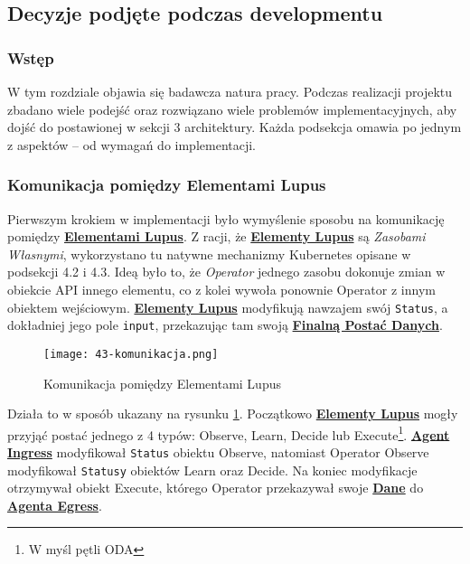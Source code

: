 \subsection{Decyzje podjęte podczas developmentu}

\subsubsection{Wstęp}

W tym rozdziale objawia się badawcza natura pracy. Podczas realizacji projektu zbadano wiele podejść oraz rozwiązano wiele problemów implementacyjnych, aby dojść do postawionej w sekcji 3 architektury. Każda podsekcja omawia po jednym z aspektów – od wymagań do implementacji.

\subsubsection{Komunikacja pomiędzy Elementami Lupus}

Pierwszym krokiem w implementacji było wymyślenie sposobu na komunikację pomiędzy \hyperlink{def:element-lupus}{\textbf{Elementami Lupus}}. Z racji, że \hyperlink{def:element-lupus}{\textbf{Elementy Lupus}} są \textit{Zasobami Własnymi}, wykorzystano tu natywne mechanizmy Kubernetes opisane w podsekcji 4.2 i 4.3. Ideą było to, że \textit{Operator} jednego zasobu dokonuje zmian w obiekcie API innego elementu, co z kolei wywoła ponownie Operator z innym obiektem wejściowym. \hyperlink{def:element-lupus}{\textbf{Elementy Lupus}} modyfikują nawzajem swój \texttt{Status}, a dokładniej jego pole \texttt{input}, przekazując tam swoją \hyperlink{def:finalne-dane}{\textbf{Finalną Postać Danych}}.

\begin{figure}[!h]
    \centering \texttt{[image: 43-komunikacja.png]}
    \caption{Komunikacja pomiędzy Elementami Lupus}\label{fig:43-komunikacja}
\end{figure}

Działa to w sposób ukazany na rysunku \ref{fig:43-komunikacja}. Początkowo \hyperlink{def:element-lupus}{\textbf{Elementy Lupus}} mogły przyjąć postać jednego z 4 typów: Observe, Learn, Decide lub Execute\footnote{W myśl pętli ODA}. \hyperlink{def:agent-ingress}{\textbf{Agent Ingress}} modyfikował \texttt{Status} obiektu Observe, natomiast Operator Observe modyfikował \texttt{Statusy} obiektów Learn oraz Decide. Na koniec modyfikacje otrzymywał obiekt Execute, którego Operator przekazywał swoje \hyperlink{def:dane}{\textbf{Dane}} do \hyperlink{def:agent-egress}{\textbf{Agenta Egress}}. 


